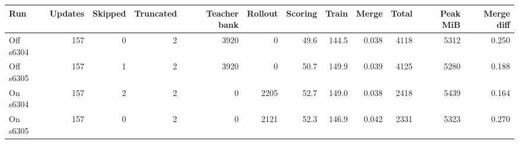 \scriptsize
\setlength{\tabcolsep}{3.5pt}
\label{tab:t3cost}
\begin{adjustbox}{max width=\linewidth}
\begin{tabular}{lrrrrrrrrrrr}
\toprule
Run & Updates & Skipped & Truncated & Teacher bank & Rollout & Scoring & Train & Merge & Total & Peak MiB & Merge diff \\
\midrule
Off s6304 & 157 & 0 & 2 & 3920 & 0 & 49.6 & 144.5 & 0.038 & 4118 & 5312 & 0.250 \\
Off s6305 & 157 & 1 & 2 & 3920 & 0 & 50.7 & 149.9 & 0.039 & 4125 & 5280 & 0.188 \\
On s6304 & 157 & 2 & 2 & 0 & 2205 & 52.7 & 149.0 & 0.038 & 2418 & 5439 & 0.164 \\
On s6305 & 157 & 0 & 2 & 0 & 2121 & 52.3 & 146.9 & 0.042 & 2331 & 5323 & 0.270 \\
\bottomrule
\end{tabular}
\end{adjustbox}
